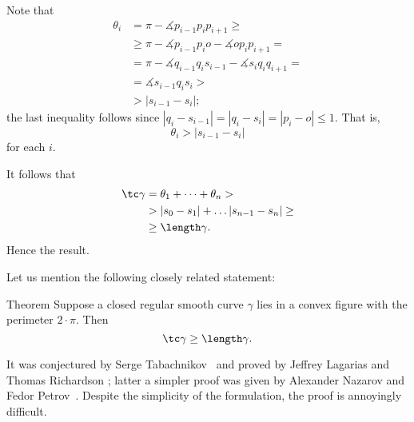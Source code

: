 Note that 
\begin{align*}
\theta_i&=\pi-\measuredangle p_{i-1}p_ip_{i+1}\ge
\\
&\ge\pi-\measuredangle p_{i-1}p_io-\measuredangle op_ip_{i+1}=
\\
&=\pi-\measuredangle q_{i-1}q_is_{i-1}-\measuredangle s_iq_iq_{i+1}=
\\
&=\measuredangle s_{i-1}q_is_i>
\\
&>|s_{i-1}-s_i|;
\end{align*}
the last inequality follows since $|q_i-s_{i-1}|=|q_i-s_i|=|p_i-o|\le 1$.
That is, 
\[\theta_i>|s_{i-1}-s_i|\]
for each $i$.

It follows that
\begin{align*}
\tc \gamma
&=\theta_1+\dots+\theta_n>
\\
&> |s_{0}-s_1|+\dots |s_{n-1}-s_n|\ge 
\\
&\ge\length \gamma.
\end{align*}
Hence the result.
\qeds


Let us mention the following closely related statement:

\begin{thm}{Theorem}
Suppose a closed regular smooth curve $\gamma$ lies in a convex figure with the perimeter $2\cdot \pi$.
Then 
\[\tc\gamma\ge \length\gamma.\]

\end{thm}

It was  conjectured by Serge Tabachnikov~\cite{tabachnikov} and proved by Jeffrey Lagarias and Thomas Richardson \cite{lagarias-richardso}; latter a simpler proof was given by Alexander Nazarov and Fedor Petrov~\cite{nazarov-petrov}.
Despite the simplicity of the formulation, the proof is annoyingly difficult.
